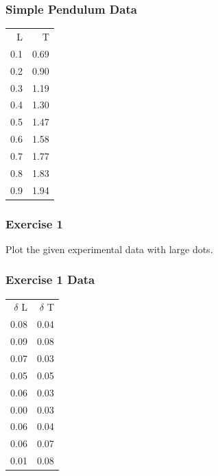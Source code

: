 \documentclass[presentation]{beamer}
\begin{document}
\begin{frame}
\frametitle{Simple Pendulum Data}
\label{sec-3}




\begin{center}
\begin{tabular}{rr}
   L  &     T  \\
 0.1  &  0.69  \\
 0.2  &  0.90  \\
 0.3  &  1.19  \\
 0.4  &  1.30  \\
 0.5  &  1.47  \\
 0.6  &  1.58  \\
 0.7  &  1.77  \\
 0.8  &  1.83  \\
 0.9  &  1.94  \\
\end{tabular}
\end{center}


  
\end{frame}
\begin{frame}
\frametitle{Exercise 1}
\label{sec-4}

  Plot the given experimental data with large dots.
      
  
\end{frame}
\begin{frame}
\frametitle{Exercise 1 Data}
\label{sec-5}


    
  

\begin{center}
\begin{tabular}{rr}
 $\delta$ L  &  $\delta$ T  \\
       0.08  &        0.04  \\
       0.09  &        0.08  \\
       0.07  &        0.03  \\
       0.05  &        0.05  \\
       0.06  &        0.03  \\
       0.00  &        0.03  \\
       0.06  &        0.04  \\
       0.06  &        0.07  \\
       0.01  &        0.08  \\
\end{tabular}
\end{center}


    
\end{frame}
\end{document}
